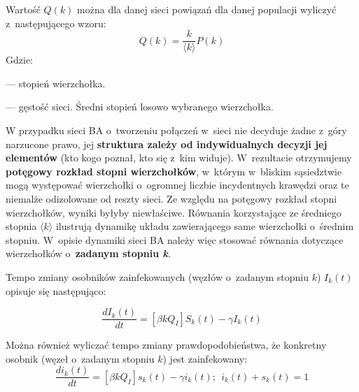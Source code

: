 Wartość $Q(k)$ można dla danej sieci powiązań dla danej populacji wyliczyć z~następującego wzoru:
\begin{equation}
\label{eq:q_k}
Q(k) = \frac{k}{\langle k \rangle}P(k)
\end{equation}
Gdzie:
\begin{description} \itemsep0pt
\item[k] --- stopień wierzchołka.
\item[$\pmb{\langle k \rangle}$] --- gęstość sieci. Średni stopień losowo wybranego wierzchołka.
\end{description}

W przypadku sieci BA o~tworzeniu połączeń w~sieci nie decyduje żadne z~góry narzucone prawo, jej \textbf{struktura zależy od indywidualnych decyzji jej elementów} (kto kogo poznał, kto się z~kim widuje). W~rezultacie otrzymujemy \textbf{potęgowy rozkład stopni wierzchołków}, w~którym w~bliskim sąsiedztwie mogą występować wierzchołki o~ogromnej liczbie incydentnych krawędzi oraz te niemalże odizolowane od reszty sieci. Ze względu na potęgowy rozkład stopni wierzchołków, wyniki byłyby niewłaściwe. Równania korzystające ze średniego stopnia \emph{$\langle k \rangle$} ilustrują dynamikę układu zawierającego same wierzchołki o~średnim stopniu. W~opisie dynamiki sieci BA należy więc stosować równania dotyczące wierzchołków o~\textbf{zadanym stopniu \emph{k}}.

Tempo zmiany osobników zainfekowanych (węzłów o~zadanym stopniu $k$) $I_k(t)$ opisuje się następująco:

\begin{equation}
\label{eq:dii_k}
\frac{dI_k(t)}{dt} = [\beta k Q_I]S_k(t) - \gamma I_k(t)
\end{equation}

Można również wyliczać tempo zmiany prawdopodobieństwa, że konkretny osobnik (węzeł o~zadanym stopniu $k$) jest zainfekowany:
\begin{equation}
\label{eq:di_k}
\frac{di_k(t)}{dt} = [\beta k Q_I]s_k(t) - \gamma i_k(t);~~i_k(t) + s_k(t) = 1
\end{equation}

